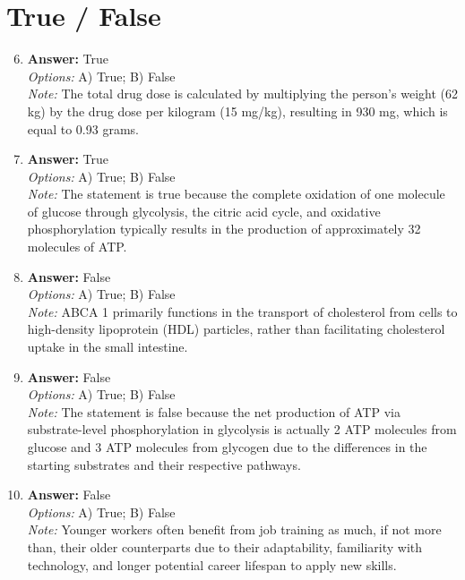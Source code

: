 \documentclass[12pt]{article}
\begin{document}
\section*{True / False}
\begin{enumerate}[label=\arabic*.]
\setcounter{enumi}{5}
\item \textbf{Answer:} True
\\ \textit{Options:} A) True; B) False
\\ \textit{Note:} The total drug dose is calculated by multiplying the person's weight (62 kg) by the drug dose per kilogram (15 mg/kg), resulting in 930 mg, which is equal to 0.93 grams.
\item \textbf{Answer:} True
\\ \textit{Options:} A) True; B) False
\\ \textit{Note:} The statement is true because the complete oxidation of one molecule of glucose through glycolysis, the citric acid cycle, and oxidative phosphorylation typically results in the production of approximately 32 molecules of ATP.
\item \textbf{Answer:} False
\\ \textit{Options:} A) True; B) False
\\ \textit{Note:} ABCA 1 primarily functions in the transport of cholesterol from cells to high-density lipoprotein (HDL) particles, rather than facilitating cholesterol uptake in the small intestine.
\item \textbf{Answer:} False
\\ \textit{Options:} A) True; B) False
\\ \textit{Note:} The statement is false because the net production of ATP via substrate-level phosphorylation in glycolysis is actually 2 ATP molecules from glucose and 3 ATP molecules from glycogen due to the differences in the starting substrates and their respective pathways.
\item \textbf{Answer:} False
\\ \textit{Options:} A) True; B) False
\\ \textit{Note:} Younger workers often benefit from job training as much, if not more than, their older counterparts due to their adaptability, familiarity with technology, and longer potential career lifespan to apply new skills.
\end{enumerate}
\end{document}
